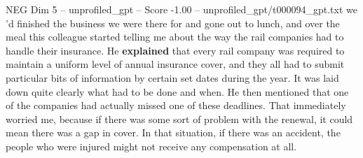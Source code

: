 \begin{textsample}{NEG Dim 5 – unprofiled\_gpt – Score -1.00 – unprofiled\_gpt/t000094\_gpt.txt}  \label{ex:f5_neg_015}
we ’d finished the business we were there for and gone out to lunch, and over the meal this colleague started telling me about the way the rail companies had to handle their insurance.
He \textbf{explained} that every rail company was required to maintain a uniform level of annual insurance cover, and they all had to submit particular bits of information by certain set dates during the year.
It was laid down quite clearly what had to be done and when.
He then mentioned that one of the companies had actually missed one of these deadlines.
That immediately worried me, because if there was some sort of problem with the renewal, it could mean there was a gap in cover.
In that situation, if there was an accident, the people who were injured might not receive any compensation at all.

\end{textsample}

